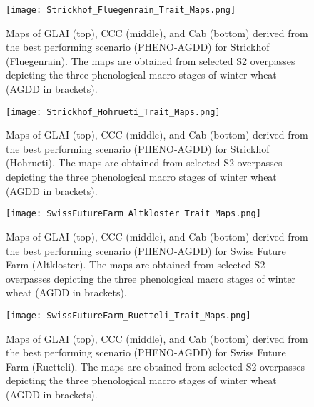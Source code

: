 \begin{figure}[H]
    \centering
    \texttt{[image: Strickhof\_Fluegenrain\_Trait\_Maps.png]}
    \caption[Maps of GLAI (top), CCC (middle), and Cab (bottom) derived from the best performing scenario (PHENO-AGDD) for Strickhof (Fluegenrain). The maps are obtained from selected S2 overpasses depicting the three phenological macro stages of winter wheat (AGDD in brackets).]{Maps of GLAI (top), CCC (middle), and Cab (bottom) derived from the best performing scenario (PHENO-AGDD) for Strickhof (Fluegenrain). The maps are obtained from selected S2 overpasses depicting the three phenological macro stages of winter wheat (AGDD in brackets).}
    \label{fig:appendix_sh_fluegenrain_2022}
\end{figure}

\begin{figure}[H]
    \centering
    \texttt{[image: Strickhof\_Hohrueti\_Trait\_Maps.png]}
    \caption[Maps of GLAI (top), CCC (middle), and Cab (bottom) derived from the best performing scenario (PHENO-AGDD) for Strickhof (Hohrueti). The maps are obtained from selected S2 overpasses depicting the three phenological macro stages of winter wheat (AGDD in brackets).]{Maps of GLAI (top), CCC (middle), and Cab (bottom) derived from the best performing scenario (PHENO-AGDD) for Strickhof (Hohrueti). The maps are obtained from selected S2 overpasses depicting the three phenological macro stages of winter wheat (AGDD in brackets).}
    \label{fig:appendix_sh_hohrueti_2022}
\end{figure}

\begin{figure}[H]
    \centering
    \texttt{[image: SwissFutureFarm\_Altkloster\_Trait\_Maps.png]}
    \caption[Maps of GLAI (top), CCC (middle), and Cab (bottom) derived from the best performing scenario (PHENO-AGDD) for Swiss Future Farm (Altkloster). The maps are obtained from selected S2 overpasses depicting the three phenological macro stages of winter wheat (AGDD in brackets).]{Maps of GLAI (top), CCC (middle), and Cab (bottom) derived from the best performing scenario (PHENO-AGDD) for Swiss Future Farm (Altkloster). The maps are obtained from selected S2 overpasses depicting the three phenological macro stages of winter wheat (AGDD in brackets).}
    \label{fig:appendix_sff_altkloster_2022}
\end{figure}

\begin{figure}[H]
    \centering
    \texttt{[image: SwissFutureFarm\_Ruetteli\_Trait\_Maps.png]}
    \caption[Maps of GLAI (top), CCC (middle), and Cab (bottom) derived from the best performing scenario (PHENO-AGDD) for Swiss Future Farm (Ruetteli). The maps are obtained from selected S2 overpasses depicting the three phenological macro stages of winter wheat (AGDD in brackets).]{Maps of GLAI (top), CCC (middle), and Cab (bottom) derived from the best performing scenario (PHENO-AGDD) for Swiss Future Farm (Ruetteli). The maps are obtained from selected S2 overpasses depicting the three phenological macro stages of winter wheat (AGDD in brackets).}
    \label{fig:appendix_sff_ruetteli_2022}
\end{figure}